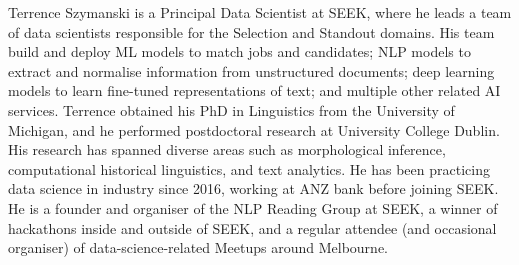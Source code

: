 Terrence Szymanski is a Principal Data Scientist at SEEK, where he leads a team of data scientists responsible for the Selection and Standout domains. His team build and deploy ML models to match jobs and candidates; NLP models to extract and normalise information from unstructured documents; deep learning models to learn fine-tuned representations of text; and multiple other related AI services. Terrence obtained his PhD in Linguistics from the University of Michigan, and he performed postdoctoral research at University College Dublin. His research has spanned diverse areas such as morphological inference, computational historical linguistics, and text analytics. He has been practicing data science in industry since 2016, working at ANZ bank before joining SEEK. He is a founder and organiser of the NLP Reading Group at SEEK, a winner of hackathons inside and outside of SEEK, and a regular attendee (and occasional organiser) of data-science-related Meetups around Melbourne.
